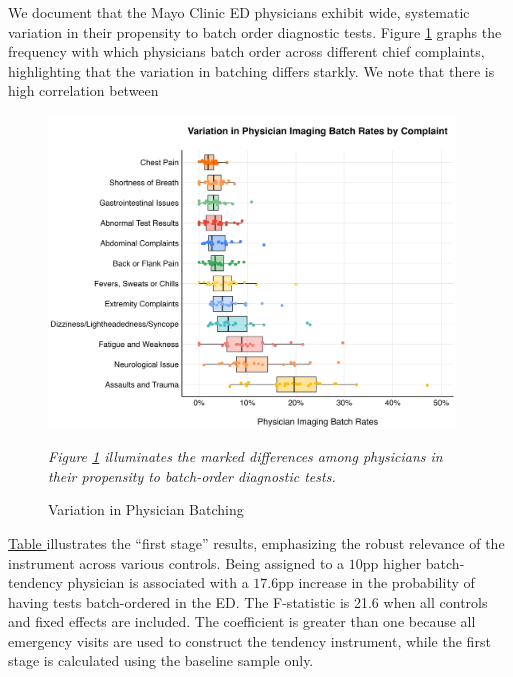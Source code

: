 \documentclass{article}
\begin{document}
We document that the Mayo Clinic ED physicians exhibit wide, systematic
variation in their propensity to batch order diagnostic tests. Figure
\ref{fig:physician_batching} graphs the frequency with which physicians
batch order across different chief complaints, highlighting that the
variation in batching differs starkly. We note that there is high
correlation between

\begin{figure}[h]
  \centering
  \caption{Variation in Physician Batching}
  \label{fig:physician_batching}
  \includegraphics[width=4.25in]{../outputs/figures/Figure 1.png}
\begin{tablenotes}
\small
\item \textit{Figure \ref{fig:physician_batching} illuminates the marked differences among physicians in their propensity to batch-order diagnostic tests.}
\end{tablenotes}  
\end{figure}

\hyperref[table:first_stage]{Table } illustrates the ``first stage''
results, emphasizing the robust relevance of the instrument across
various controls. Being assigned to a \(10\)pp higher batch-tendency
physician is associated with a \(17.6\)pp increase in the probability of
having tests batch-ordered in the ED. The F-statistic is 21.6 when all
controls and fixed effects are included. The coefficient is greater than
one because all emergency visits are used to construct the tendency
instrument, while the first stage is calculated using the baseline
sample only.
\end{document}
